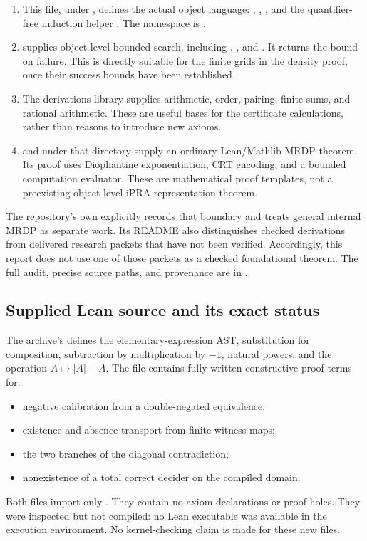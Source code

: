 \begin{enumerate}
\item {}\par
This file, under , defines the actual object
language: , , , and the quantifier-free
induction helper . The namespace is
.
\item {} supplies
object-level bounded search, including ,
, and . It returns the bound on
failure. This is directly suitable for the finite grids in the density
proof, once their success bounds have been established.
\item The derivations library supplies arithmetic, order, pairing, finite
sums, and rational arithmetic. These are useful bases for the certificate
calculations, rather than reasons to introduce new axioms.
\item {} and
 under that directory supply an
ordinary Lean/Mathlib MRDP theorem. Its proof uses Diophantine
exponentiation, CRT encoding, and a bounded computation evaluator.
These are mathematical proof templates, not a preexisting object-level
iPRA representation theorem.
\end{enumerate}

The repository's own  explicitly records that
boundary and treats general internal MRDP as separate work. Its README
also distinguishes checked  derivations from delivered
research packets that have not been verified. Accordingly, this report
does not use one of those packets as a checked foundational theorem.
The full audit, precise source paths, and provenance are in
.

\subsection{Supplied Lean source and its exact status}

The archive's  defines the elementary-expression
AST, substitution for composition, subtraction by multiplication by
$-1$, natural powers, and the operation $A\mapsto |A|-A$.
The file  contains fully written constructive
proof terms for:
\begin{itemize}
\item negative calibration from a double-negated equivalence;
\item existence and absence transport from finite witness maps;
\item the two branches of the diagonal contradiction;
\item nonexistence of a total correct decider on the compiled domain.
\end{itemize}
Both files import only . They contain no axiom declarations
or proof holes. They were inspected but not compiled: no Lean executable
was available in the execution environment. No kernel-checking claim is
made for these new files.

